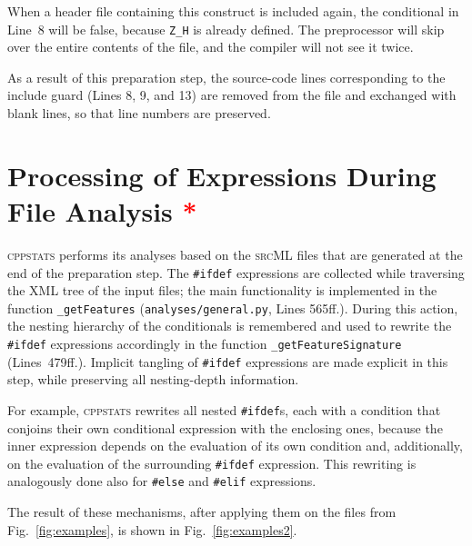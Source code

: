 \documentclass[a4paper]{scrartcl}
\newcommand\code[1]{\texttt{#1}}
\newcommand\feature[1]{\texttt{#1}}
\newcommand\tool[1]{\textsc{#1}}
\newcommand\ifdeff[1]{\code{\##1}\xspace}
\newcommand\ifdef[0]{{\upshape\ifdeff{ifdef}}\xspace}
\newcommand\ifdefs[0]{\ifdef{}s\xspace}
\newcommand\cppstats[0]{\tool{cppstats}\xspace}
\newcommand\affected{\textcolor{red}{*}\xspace}
\begin{document}
When a header file containing this construct is included again, the conditional in Line~8 will be false, because \feature{Z\_H} is already defined.
The preprocessor will skip over the entire contents of the file, and the compiler will not see it twice.

As a result of this preparation step, the source-code lines corresponding to the include guard (Lines 8, 9, and 13) are removed from the file and exchanged with blank lines, so that line numbers are preserved.



\section{Processing of Expressions During File Analysis \affected}
\label{sec:processing}

\cppstats performs its analyses based on the \tool{srcML} files that are generated at the end of the preparation step.
The \ifdef expressions are collected while traversing the \tool{XML} tree of the input files;
the main functionality is implemented in the function \code{\_getFeatures} (\code{analyses/general.py}, Lines 565ff.).
During this action, the nesting hierarchy of the conditionals is remembered and used to rewrite the \ifdef expressions accordingly in the function \code{\_getFeatureSignature} (Lines~479ff.).
Implicit tangling of \ifdef expressions are made explicit in this step, while preserving all nesting-depth information.

For example, \cppstats rewrites all nested \ifdefs, each with a condition that conjoins their own conditional expression with the enclosing ones, because the inner expression depends on the evaluation of its own condition and, additionally, on the evaluation of the surrounding \ifdef expression.
This rewriting is analogously done also for \ifdeff{else} and \ifdeff{elif} expressions.
 
The result of these mechanisms, after applying them on the files from Fig.\ \ref{fig:examples}, is shown in Fig.\ \ref{fig:examples2}.
\end{document}
